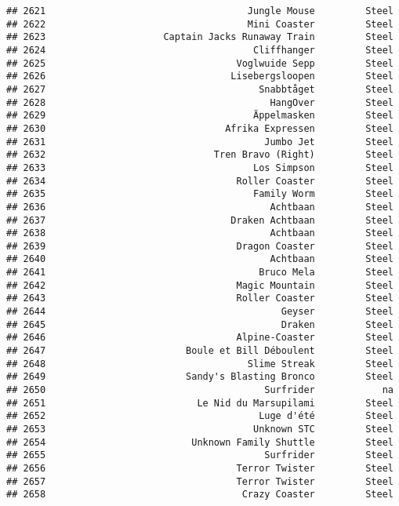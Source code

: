 \documentclass[
]{article}
\begin{document}
\begin{verbatim}
## 2621                                    Jungle Mouse         Steel
## 2622                                    Mini Coaster         Steel
## 2623                     Captain Jacks Runaway Train         Steel
## 2624                                     Cliffhanger         Steel
## 2625                                  Voglwuide Sepp         Steel
## 2626                                 Lisebergsloopen         Steel
## 2627                                      Snabbtåget         Steel
## 2628                                        HangOver         Steel
## 2629                                     Äppelmasken         Steel
## 2630                                Afrika Expressen         Steel
## 2631                                       Jumbo Jet         Steel
## 2632                              Tren Bravo (Right)         Steel
## 2633                                     Los Simpson         Steel
## 2634                                  Roller Coaster         Steel
## 2635                                     Family Worm         Steel
## 2636                                        Achtbaan         Steel
## 2637                                 Draken Achtbaan         Steel
## 2638                                        Achtbaan         Steel
## 2639                                  Dragon Coaster         Steel
## 2640                                        Achtbaan         Steel
## 2641                                      Bruco Mela         Steel
## 2642                                  Magic Mountain         Steel
## 2643                                  Roller Coaster         Steel
## 2644                                          Geyser         Steel
## 2645                                          Draken         Steel
## 2646                                  Alpine-Coaster         Steel
## 2647                         Boule et Bill Déboulent         Steel
## 2648                                    Slime Streak         Steel
## 2649                         Sandy's Blasting Bronco         Steel
## 2650                                       Surfrider            na
## 2651                           Le Nid du Marsupilami         Steel
## 2652                                      Luge d'été         Steel
## 2653                                     Unknown STC         Steel
## 2654                          Unknown Family Shuttle         Steel
## 2655                                       Surfrider         Steel
## 2656                                  Terror Twister         Steel
## 2657                                  Terror Twister         Steel
## 2658                                   Crazy Coaster         Steel

\end{verbatim}
\end{document}
